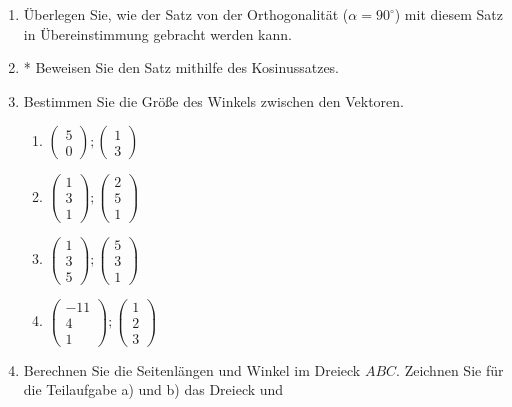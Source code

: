 \documentclass[12pt,a4paper,twoside,fleqn]{article}
\begin{document}
\begin{enumerate}
\item Überlegen Sie, wie der Satz von der Orthogonalität ($\alpha =
  90^\circ$) mit diesem Satz in Übereinstimmung gebracht werden kann.
\item * Beweisen Sie den Satz mithilfe des Kosinussatzes.
\item Bestimmen Sie die Größe des Winkels zwischen den Vektoren.
  \begin{multicols}{4}
    \begin{enumerate}
    \item  $\begin{pmatrix}
      5\\0
    \end{pmatrix};
   \begin{pmatrix}
      1\\3
    \end{pmatrix} $
  \item $\begin{pmatrix}
      1\\3\\1
    \end{pmatrix};
   \begin{pmatrix}
      2\\5\\1
    \end{pmatrix} $
  \item $\begin{pmatrix}
      1\\3\\5
    \end{pmatrix};
   \begin{pmatrix}
      5\\3\\1
    \end{pmatrix} $
  \item  $\begin{pmatrix}
      -11\\4\\1
    \end{pmatrix};
   \begin{pmatrix}
      1\\2\\3
    \end{pmatrix} $
    \end{enumerate}
  \end{multicols}
\item Berechnen Sie die Seitenlängen und Winkel im Dreieck
  $ABC$. Zeichnen Sie für die Teilaufgabe a) und b) das Dreieck und

\end{enumerate}
\end{document}
